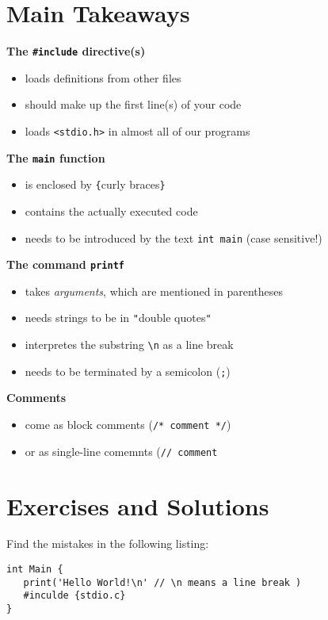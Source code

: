 \section{Main Takeaways}
\begin{defbox}
\textbf{The \texttt{\#include} directive(s)}
\begin{itemize}
\item loads definitions from other files
\item should make up the first line(s) of your code
\item loads \texttt{<stdio.h>} in almost all of our programs
\end{itemize}

\textbf{The \texttt{main} function}
\begin{itemize}
\item is enclosed by \texttt{\{}curly braces\texttt{\}}
\item contains the actually executed code
\item needs to be introduced by the text \texttt{int main} (case sensitive!)
\end{itemize}
\end{defbox}
%
\begin{defbox}[]
\textbf{The command \texttt{printf}}
\begin{itemize}
\item takes \emph{arguments}, which are mentioned in parentheses
\item needs strings to be in \texttt{"}double quotes\texttt{"}
\item interpretes the substring \texttt{\textbackslash n} as a line break
\item needs to be terminated by a semicolon (\texttt{;})
\end{itemize}

\textbf{Comments}
\begin{itemize}
\item come as block comments (\texttt{/* comment */})
\item or as single-line comemnts (\texttt{// comment}
\end{itemize}
\end{defbox}

\newpage
\section{Exercises and Solutions}
Find the mistakes in the following listing:
\begin{codebox}
\begin{verbatim}
int Main {
   print('Hello World!\n' // \n means a line break )
   #inculde {stdio.c}
}
\end{verbatim}
\end{codebox}

